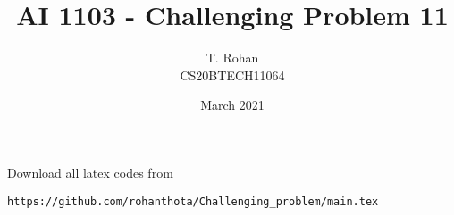 \documentclass[journal,12pt,twocolumn]{IEEEtran}
\date{March 2021}
\begin{document}
\newcommand{\BEQA}{\begin{eqnarray}}
\newcommand{\EEQA}{\end{eqnarray}}
\newcommand{\define}{\stackrel{\triangle}{=}}

\raggedbottom
\setlength{\parindent}{0pt}
\providecommand{\mbf}{\mathbf}
\providecommand{\pr}[1]{\ensuremath{\Pr\left(#1\right)}}
\providecommand{\qfunc}[1]{\ensuremath{Q\left(#1\right)}}
\providecommand{\fn}[1]{\ensuremath{f\left(#1\right)}}
\providecommand{\e}[1]{\ensuremath{E\left(#1\right)}}
\providecommand{\sbrak}[1]{\ensuremath{{}\left[#1\right]}}
\providecommand{\lsbrak}[1]{\ensuremath{{}\left[#1\right.}}
\providecommand{\rsbrak}[1]{\ensuremath{{}\left.#1\right]}}
\providecommand{\brak}[1]{\ensuremath{\left(#1\right)}}
\providecommand{\lbrak}[1]{\ensuremath{\left(#1\right.}}
\providecommand{\rbrak}[1]{\ensuremath{\left.#1\right)}}
\providecommand{\cbrak}[1]{\ensuremath{\left\{#1\right\}}}
\providecommand{\lcbrak}[1]{\ensuremath{\left\{#1\right.}}
\providecommand{\rcbrak}[1]{\ensuremath{\left.#1\right\}}}
\theoremstyle{remark}
\newtheorem{rem}{Remark}
\newcommand{\sgn}{\mathop{\mathrm{sgn}}}
\providecommand{\abs}[1]{\vert#1\vert}
\providecommand{\res}[1]{\Res\displaylimits_{#1}} 
\providecommand{\norm}[1]{\lVert#1\rVert}
\providecommand{\mtx}[1]{\mathbf{#1}}
\providecommand{\mean}[1]{E[ #1 ]}
\providecommand{\fourier}{\overset{\mathcal{F}}{ \rightleftharpoons}}
\providecommand{\system}{\overset{\mathcal{H}}{ \longleftrightarrow}}
\newcommand{\solution}{\noindent \textbf{Solution: }}
\newcommand{\cosec}{\,\text{cosec}\,}
\providecommand{\dec}[2]{\ensuremath{\overset{#1}{\underset{#2}{\gtrless}}}}
\newcommand{\myvec}[1]{\ensuremath{\begin{pmatrix}#1\end{pmatrix}}}
\newcommand{\mydet}[1]{\ensuremath{\begin{vmatrix}#1\end{vmatrix}}}
\makeatletter
{}
\makeatother
\let\StandardTheFigure\thefigure
\let\vec\mathbf
\renewcommand{\thefigure}{\theproblem}
\def\putbox#1#2#3{\makebox[0in][l]{\makebox[#1][l]{}\raisebox{\baselineskip}[0in][0in]{\raisebox{#2}[0in][0in]{#3}}}}
     \def\rightbox#1{\makebox[0in][r]{#1}}
     \def\centbox#1{\makebox[0in]{#1}}
     \def\topbox#1{\raisebox{-\baselineskip}[0in][0in]{#1}}
     \def\midbox#1{\raisebox{-0.5\baselineskip}[0in][0in]{#1}}
\vspace{3cm}
\title{AI 1103 - Challenging Problem 11}
\author{T. Rohan \\ CS20BTECH11064}
\maketitle
\newpage
\bigskip
\renewcommand{\thefigure}{\theenumi}
\renewcommand{\thetable}{\theenumi}
Download all latex codes from 
\begin{lstlisting}
https://github.com/rohanthota/Challenging_problem/main.tex
\end{lstlisting}
\end{document}
